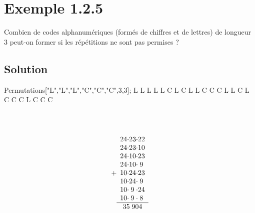 \section*{Exemple 1.2.5}
	Combien de codes alphanumériques (formés de chiff{}res et de lettres) de longueur 3 peut-on former si les répétitions ne sont pas permises ?
\subsection*{Solution}
\begin{multicols}{2}
\begin{verbbox}
Permutations[{"L","L","L","C","C","C"},{3,3}];
	L	L	L
	L	L	C
	L	C	L
	L	C	C
	C	L	L
	C	L	C
	C	C	L
	C	C	C
	\end{verbbox}
	\theverbbox
	\columnbreak
	\\
	\\
	\begin{equation*}
	+\begin{array}{c @{\cdot}c @{\cdot}c}
	24&23&22\\
	24&23&10\\
	24&10&23\\
	24&10&9\\
	10&24&23\\
	10&24&9\\
	10&9&24\\
	10&9&8\\
	\hline
	\multicolumn{3}{c}{35\;904}
	\end{array}
	\end{equation*}
\end{multicols}